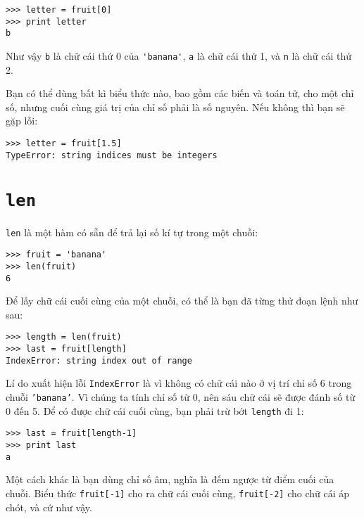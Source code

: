 \documentclass[11pt]{book}
\begin{document}
\beforeverb
\begin{verbatim}
>>> letter = fruit[0]
>>> print letter
b
\end{verbatim}
\afterverb
%
Như vậy {\tt b} là chữ cái thứ 0 của \verb"'banana'", {\tt a}
là chữ cái thứ 1, và {\tt n} là chữ cái thứ 2.


Bạn có thể dùng bất kì biểu thức nào, bao gồm các biến và toán tử,
cho một chỉ số, nhưng cuối cùng giá trị của chỉ số phải là số nguyên.
Nếu không thì bạn sẽ gặp lỗi:


\beforeverb
\begin{verbatim}
>>> letter = fruit[1.5]
TypeError: string indices must be integers
\end{verbatim}
\afterverb
%

\section{{\tt len}}


{\tt len} là một hàm có sẵn để trả lại số kí tự trong một chuỗi:

\beforeverb
\begin{verbatim}
>>> fruit = 'banana'
>>> len(fruit)
6
\end{verbatim}
\afterverb
%
Để lấy chữ cái cuối cùng của một chuỗi, có thể là bạn đã từng thử đoạn
lệnh như sau:


\beforeverb
\begin{verbatim}
>>> length = len(fruit)
>>> last = fruit[length]
IndexError: string index out of range
\end{verbatim}
\afterverb
%
Lí do xuất hiện lỗi {\tt IndexError} là vì không có chữ cái nào ở vị trí chỉ số 6
trong chuỗi {\tt'banana'}. Vì chúng ta tính chỉ số từ 0, nên sáu chữ cái sẽ được
đánh số từ 0 đến 5. Để có được chữ cái cuối cùng, bạn phải trừ bớt 
{\tt length} đi 1:

\beforeverb
\begin{verbatim}
>>> last = fruit[length-1]
>>> print last
a
\end{verbatim}
\afterverb
%
Một cách khác là bạn dùng chỉ số âm, nghĩa là đếm ngược từ điểm cuối của
chuỗi. Biểu thức {\tt fruit[-1]} cho ra chữ cái cuối cùng, {\tt fruit[-2]} cho
chữ cái áp chót, và cứ như vậy.
\end{document}
